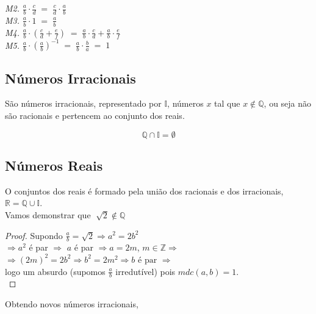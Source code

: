 \noindent
\emph{M2.} $ \frac{a}{b} \cdot \frac{c}{d} \; = \; \frac{c}{d} \cdot \frac{a}{b}$ \\

\noindent
\emph{M3.} $ \frac{a}{b} \cdot 1 \; = \; \frac{a}{b} $ \\

\noindent
\emph{M4.} $ \frac{a}{b} \cdot ( \frac{c}{d} + \frac{e}{f}) \; = \; \frac{a}{b} \cdot \frac{c}{d} + \frac{a}{b} \cdot \frac{e}{f}  $ \\

\noindent
\emph{M5.} $ \frac{a}{b} \cdot (\frac{a}{b})^{-1} \; = \; \frac{a}{b} \cdot \frac{b}{a} \; = \; 1$ 


\subsection{Números Irracionais}

\noindent
São números irracionais, representado por $\mathbb{I}$, números $x$ tal que $x \notin \mathbb{Q}$, ou seja não são racionais e pertencem ao conjunto dos reais.

$$ \mathbb{Q} \cap \mathbb{I} = \emptyset$$ 


\subsection{Números Reais}
\noindent
O conjuntos dos reais é formado pela união dos racionais e dos irracionais, 
$ \mathbb{R} = \mathbb{Q} \cup \mathbb{I} $.\\

\noindent
\text{\maltese} Vamos demonstrar que $\; \sqrt{2} \notin \mathbb{Q}$ 

\begin{proof}
	Supondo $ \frac{a}{b} = \sqrt{2} \Rightarrow a^2 = 2b^2 $ \\
	$ \Rightarrow a^2 $ é par $ \Rightarrow $ $a$ é par $ \Rightarrow a = 2m$, $ m \in \mathbb{Z} \Rightarrow $ \\
	$ \Rightarrow (2m)^2 = 2b^2 \Rightarrow b^2 = 2m^2 \Rightarrow b \text{ é par } \Rightarrow $ \\
	logo um absurdo (supomos $\frac{a}{b}$ irredutível)  pois $mdc(a,b) = 1$. \\
\end{proof}

\noindent
Obtendo novos números irracionais,\\

